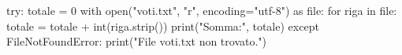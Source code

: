 \begin{unipdcode}[language=Python]
try:
    totale = 0
    with open("voti.txt", "r", encoding="utf-8") as file:
        for riga in file:
            totale = totale + int(riga.strip())
    print("Somma:", totale)
except FileNotFoundError:
    print("File voti.txt non trovato.")
\end{unipdcode}
